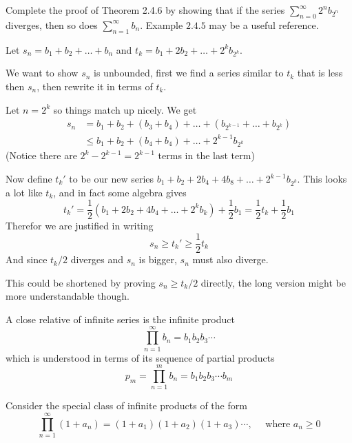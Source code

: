 \begin{exercise}
  Complete the proof of Theorem 2.4.6 by showing that if the series $\sum_{n=0}^{\infty} 2^{n} b_{2^{n}}$ diverges, then so does $\sum_{n=1}^{\infty} b_{n}$. Example $2.4 .5$ may be a useful reference.
\end{exercise}

\begin{solution}
  Let $s_n = b_1 + b_2 + \dots + b_n$ and $t_k = b_1 + 2b_2 + \dots + 2^kb_{2^k}$.

  We want to show $s_n$ is unbounded, first we find a series similar to $t_k$ that is less then $s_n$, then rewrite it in terms of $t_k$.

  Let $n = 2^k$ so things match up nicely. We get
  $$
  \begin{aligned}
  s_n
  &=   b_1 + b_2 + (b_3 + b_4) + \dots + (b_{2^{k-1}} + \dots + b_{2^k}) \\
  &\le b_1 + b_2 + (b_4 + b_4) + \dots + 2^{k-1}b_{2^k}
  \end{aligned}
  $$
  (Notice there are $2^k - 2^{k-1} = 2^{k-1}$ terms in the last term)

  Now define $t_k'$ to be our new series $b_1 + b_2 + 2b_4 + 4b_8 + \dots + 2^{k-1}b_{2^k}$.
  This looks a lot like $t_k$, and in fact some algebra gives
  $$
  t_k'
  = \frac 12 \left(b_1 + 2b_2 + 4b_4 + \dots + 2^kb_k\right) + \frac 12 b_1
  = \frac 12 t_k + \frac 12 b_1
  $$
  Therefor we are justified in writing
  $$
  s_n \ge t_k' \ge \frac 12 t_k
  $$
  And since $t_k/2$ diverges and $s_n$ is bigger, $s_n$ must also diverge.

  \TODO This could be shortened by proving $s_n \ge t_k/2$ directly, the long version might be more understandable though.
\end{solution}

\begin{exercise}
  A close relative of infinite series is the infinite product
  $$
  \prod_{n=1}^{\infty} b_{n}=b_{1} b_{2} b_{3} \cdots
  $$
  which is understood in terms of its sequence of partial products
  $$
  p_{m}=\prod_{n=1}^{m} b_{n}=b_{1} b_{2} b_{3} \cdots b_{m}
  $$

  Consider the special class of infinite products of the form
  $$
  \prod_{n=1}^{\infty}\left(1+a_{n}\right)=\left(1+a_{1}\right)\left(1+a_{2}\right)\left(1+a_{3}\right) \cdots, \quad \text { where } a_{n} \geq 0
  $$
\end{exercise}

